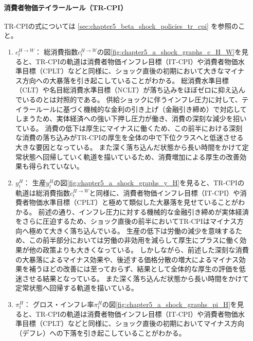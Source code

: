 \paragraph{消費者物価テイラールール（TR-CPI）}
\label{sec:chapter5_a_shock_policies_tr_cpi}
TR-CPIの式については
\ref{sec:chapter5_beta_shock_policies_tr_cpi}
を参照のこと。
\begin{enumerate}
    \item
    \label{itm:chapter5_a_shock_policies_tr_cpi_c_H_W}
        \(c_t^{H\to W}\)：
        総消費指数\(c_t^{H\to W}\)の図\ref{fig:chapter5_a_shock_graphs_c_H_W}を見ると、TR-CPIの軌道は消費者物価インフレ目標（IT-CPI）や消費者物価水準目標（CPLT）などと同様に、ショック直後の初期において大きなマイナス方向への大暴落を引き起こしていることがわかる。
        総消費水準目標（CLT）や名目総消費水準目標（NCLT）が落ち込みをほぼゼロに抑え込んでいるのとは対照的である。
        供給ショックに伴うインフレ圧力に対して、テイラールールに基づく機械的な金利の引き上げ（金融引き締め）で対応してしまうため、実体経済への強い下押し圧力が働き、消費の深刻な減少を招いている。
        消費の低下は厚生にマイナスに働くため、この前半における深刻な消費の落ち込みがTR-CPIの厚生を全体の中で下位クラスへと低迷させる大きな要因となっている。
        また深く落ち込んだ状態から長い時間をかけて定常状態へ回帰していく軌道を描いているため、消費増加による厚生の改善効果も得られていない。
    \item
    \label{itm:chapter5_a_shock_policies_tr_cpi_y_H}
        \(y_t^H\)：
        生産\(y_t^H\)の図\ref{fig:chapter5_a_shock_graphs_y_H}を見ると、TR-CPIの軌道は総消費指数\(c_t^{H\to W}\)と同様に、消費者物価インフレ目標（IT-CPI）や消費者物価水準目標（CPLT）と極めて類似した大暴落を見せていることがわかる。
        前述の通り、インフレ圧力に対する機械的な金融引き締めが実体経済をさらに圧迫するため、ショック直後の前半においてTR-CPIはマイナス方向へ極めて大きく落ち込んでいる。
        生産の低下は労働の減少を意味するため、この前半部分においては労働の非効用を減らして厚生にプラスに働く効果が他の政策よりも大きくなっている。
        しかしながら、前述した深刻な消費の大暴落によるマイナス効果や、後述する価格分散の増大によるマイナス効果を補うほどの改善には至っておらず、結果として全体的な厚生の評価を低迷させる結果となっている。
        また深く落ち込んだ状態から長い時間をかけて定常状態へ回帰する軌道を描いている。
    \item
    \label{itm:chapter5_a_shock_policies_tr_cpi_pi_H}
        \(\pi_t^H\)：
        グロス・インフレ率\(\pi_t^H\)の図\ref{fig:chapter5_a_shock_graphs_pi_H}を見ると、TR-CPIの軌道は消費者物価インフレ目標（IT-CPI）や消費者物価水準目標（CPLT）などと同様に、ショック直後の初期においてマイナス方向（デフレ）への下落を引き起こしていることがわかる。

\end{enumerate}
